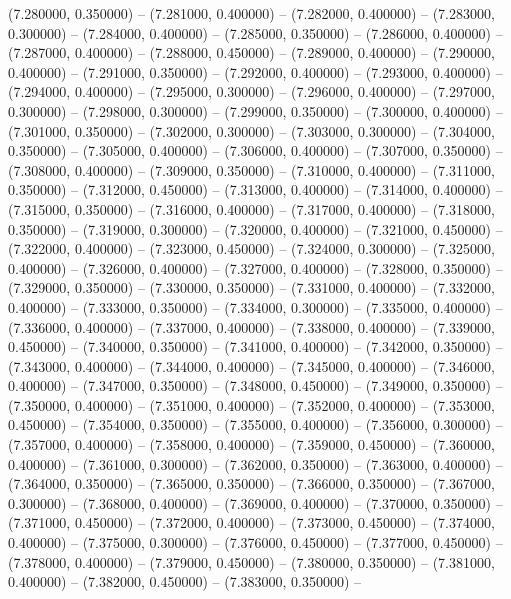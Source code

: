 (7.280000, 0.350000) -- 
(7.281000, 0.400000) -- 
(7.282000, 0.400000) -- 
(7.283000, 0.300000) -- 
(7.284000, 0.400000) -- 
(7.285000, 0.350000) -- 
(7.286000, 0.400000) -- 
(7.287000, 0.400000) -- 
(7.288000, 0.450000) -- 
(7.289000, 0.400000) -- 
(7.290000, 0.400000) -- 
(7.291000, 0.350000) -- 
(7.292000, 0.400000) -- 
(7.293000, 0.400000) -- 
(7.294000, 0.400000) -- 
(7.295000, 0.300000) -- 
(7.296000, 0.400000) -- 
(7.297000, 0.300000) -- 
(7.298000, 0.300000) -- 
(7.299000, 0.350000) -- 
(7.300000, 0.400000) -- 
(7.301000, 0.350000) -- 
(7.302000, 0.300000) -- 
(7.303000, 0.300000) -- 
(7.304000, 0.350000) -- 
(7.305000, 0.400000) -- 
(7.306000, 0.400000) -- 
(7.307000, 0.350000) -- 
(7.308000, 0.400000) -- 
(7.309000, 0.350000) -- 
(7.310000, 0.400000) -- 
(7.311000, 0.350000) -- 
(7.312000, 0.450000) -- 
(7.313000, 0.400000) -- 
(7.314000, 0.400000) -- 
(7.315000, 0.350000) -- 
(7.316000, 0.400000) -- 
(7.317000, 0.400000) -- 
(7.318000, 0.350000) -- 
(7.319000, 0.300000) -- 
(7.320000, 0.400000) -- 
(7.321000, 0.450000) -- 
(7.322000, 0.400000) -- 
(7.323000, 0.450000) -- 
(7.324000, 0.300000) -- 
(7.325000, 0.400000) -- 
(7.326000, 0.400000) -- 
(7.327000, 0.400000) -- 
(7.328000, 0.350000) -- 
(7.329000, 0.350000) -- 
(7.330000, 0.350000) -- 
(7.331000, 0.400000) -- 
(7.332000, 0.400000) -- 
(7.333000, 0.350000) -- 
(7.334000, 0.300000) -- 
(7.335000, 0.400000) -- 
(7.336000, 0.400000) -- 
(7.337000, 0.400000) -- 
(7.338000, 0.400000) -- 
(7.339000, 0.450000) -- 
(7.340000, 0.350000) -- 
(7.341000, 0.400000) -- 
(7.342000, 0.350000) -- 
(7.343000, 0.400000) -- 
(7.344000, 0.400000) -- 
(7.345000, 0.400000) -- 
(7.346000, 0.400000) -- 
(7.347000, 0.350000) -- 
(7.348000, 0.450000) -- 
(7.349000, 0.350000) -- 
(7.350000, 0.400000) -- 
(7.351000, 0.400000) -- 
(7.352000, 0.400000) -- 
(7.353000, 0.450000) -- 
(7.354000, 0.350000) -- 
(7.355000, 0.400000) -- 
(7.356000, 0.300000) -- 
(7.357000, 0.400000) -- 
(7.358000, 0.400000) -- 
(7.359000, 0.450000) -- 
(7.360000, 0.400000) -- 
(7.361000, 0.300000) -- 
(7.362000, 0.350000) -- 
(7.363000, 0.400000) -- 
(7.364000, 0.350000) -- 
(7.365000, 0.350000) -- 
(7.366000, 0.350000) -- 
(7.367000, 0.300000) -- 
(7.368000, 0.400000) -- 
(7.369000, 0.400000) -- 
(7.370000, 0.350000) -- 
(7.371000, 0.450000) -- 
(7.372000, 0.400000) -- 
(7.373000, 0.450000) -- 
(7.374000, 0.400000) -- 
(7.375000, 0.300000) -- 
(7.376000, 0.450000) -- 
(7.377000, 0.450000) -- 
(7.378000, 0.400000) -- 
(7.379000, 0.450000) -- 
(7.380000, 0.350000) -- 
(7.381000, 0.400000) -- 
(7.382000, 0.450000) -- 
(7.383000, 0.350000) -- 
